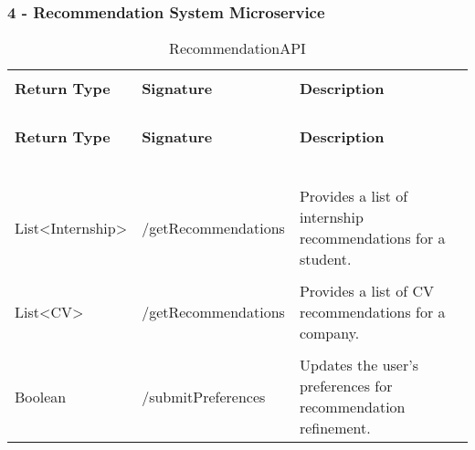 \subsubsection{4 - Recommendation System Microservice}

\begin{longtable}{p{}p{}p{}}
    \caption{RecommendationAPI}
    \vspace{0.5em}\\
    \hline
    \vspace{0.5em}\\
    \textbf{Return Type} & \textbf{Signature} & \textbf{Description} \\
    \vspace{0.5em}\\
    \hline
    \vspace{0.5em}\\
    \endfirsthead
    \vspace{0.5em}\\
    \hline
    \vspace{0.5em}\\
    \textbf{Return Type} & \textbf{Signature} & \textbf{Description} \\
    \vspace{0.5em}\\
    \hline
    \vspace{0.5em}\\
    \endhead
    
    \vspace{0.5em}\\
    \hline
    \vspace{0.5em}\\
    \endfoot
    
    \vspace{0.5em}\\
    \hline
    \vspace{0.5em}\\
    \endlastfoot
    
    List<Internship> &
    /getRecommendations &
    Provides a list of internship recommendations for a student. \\
    \vspace{0.5em}\\
    List<CV> &
    /getRecommendations &
    Provides a list of CV recommendations for a company. \\
    \vspace{0.5em}\\
    Boolean &
    /submitPreferences &
    Updates the user's preferences for recommendation refinement. \\

\end{longtable}

